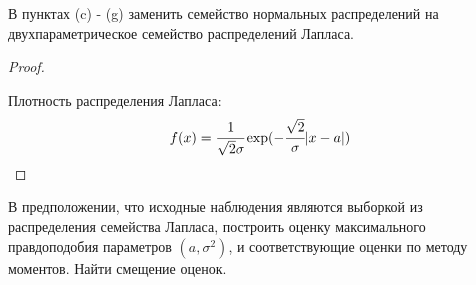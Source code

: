 \begin{problem}
	В пунктах (c) - (g) заменить семейство нормальных распределений на двухпараметрическое семейство распределений Лапласа.
\end{problem}

\begin{proof}
	$ $
	
	Плотность распределения Лапласа: 
	\begin{equation}
		f(x)=\cfrac1{\sqrt{2}\sigma}\exp(-\cfrac{\sqrt{2}}{\sigma}|x-a|)
	\end{equation}
\end{proof}


\begin{problem}
	В предположении, что исходные наблюдения являются выборкой из распределения семейства Лапласа, построить оценку максимального правдоподобия параметров $(a, \sigma^2)$, и соответствующие оценки по методу моментов. Найти смещение оценок. 
\end{problem}

